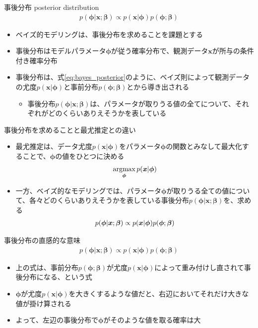 \documentclass[aspectratio=169,unicode,dvipdfmx,14pt]{beamer}
\begin{document}
\begin{frame}{事後分布 posterior distribution}
\vspace{-.2in}
\begin{align}
p(\bm{\phi}|\bm{x};\bm{\beta}) \propto p(\bm{x}|\bm{\phi})p(\bm{\phi};\bm{\beta})
\label{eq:bayes_posterior}
\end{align}
\vspace{-.2in}
\begin{itemize}
\item ベイズ的モデリングは、事後分布を求めることを課題とする
\item 事後分布はモデルパラメータ$\bm{\phi}$が従う確率分布で、観測データ$\bm{x}$が所与の条件付き確率分布
\item 事後分布は、式\eqref{eq:bayes_posterior}のように、ベイズ則によって観測データの尤度$p(\bm{x}|\bm{\phi})$と事前分布$p(\bm{\phi};\bm{\beta})$とから導き出される
\begin{itemize}
\item 事後分布$p(\bm{\phi}|\bm{x};\bm{\beta})$は、パラメータが取りうる値の全てについて、それぞれがどのくらいありえそうかを表している
\end{itemize}
\end{itemize}
\end{frame}

\begin{frame}{事後分布を求めることと最尤推定との違い}
\begin{itemize}
\item 最尤推定は、データ尤度$p(\bm{x}|\bm{\phi})$をパラメータ$\bm{\phi}$の関数とみなして最大化することで、$\bm{\phi}$の値をひとつに決める
\begin{align}
\operatorname*{argmax}_{\bm{\phi}} p(\bm{x}|\bm{\phi})
\notag
\end{align}
\item 一方、ベイズ的なモデリングでは、パラメータ$\bm{\phi}$が取りうる全ての値について、各々どのくらいありえそうかを表している事後分布$p(\bm{\phi}|\bm{x};\bm{\beta})$を、求める
\begin{align}
p(\bm{\phi}|\bm{x};\bm{\beta}) \propto p(\bm{x}|\bm{\phi})p(\bm{\phi};\bm{\beta})
\notag
\end{align}
\end{itemize}
\end{frame}

\begin{frame}{事後分布の直感的な意味}
\vspace{-.2in}
\begin{align}
p(\bm{\phi}|\bm{x};\bm{\beta}) \propto p(\bm{x}|\bm{\phi})p(\bm{\phi};\bm{\beta})
\end{align}
\vspace{-.2in}
\begin{itemize}
\item 上の式は、事前分布$p(\bm{\phi};\bm{\beta})$が尤度$p(\bm{x}|\bm{\phi})$によって重み付けし直されて事後分布になる、という式
\item $\bm{\phi}$が尤度$p(\bm{x}|\bm{\phi})$を大きくするような値だと、右辺においてそれだけ大きな値が掛け算される
\item よって、左辺の事後分布で$\bm{\phi}$がそのような値を取る確率は大
\end{itemize}
\end{frame}
\end{document}
